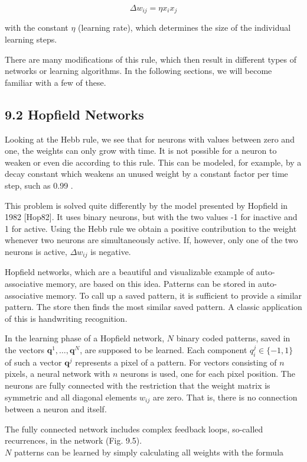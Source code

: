 \documentclass[10pt]{article}
\begin{document}
$$
\Delta w_{i j}=\eta x_{i} x_{j}
$$

with the constant $\eta$ (learning rate), which determines the size of the individual learning steps.

There are many modifications of this rule, which then result in different types of networks or learning algorithms. In the following sections, we will become familiar with a few of these.

\subsection*{9.2 Hopfield Networks}
Looking at the Hebb rule, we see that for neurons with values between zero and one, the weights can only grow with time. It is not possible for a neuron to weaken or even die according to this rule. This can be modeled, for example, by a decay constant which weakens an unused weight by a constant factor per time step, such as 0.99 .

This problem is solved quite differently by the model presented by Hopfield in 1982 [Hop82]. It uses binary neurons, but with the two values -1 for inactive and 1 for active. Using the Hebb rule we obtain a positive contribution to the weight whenever two neurons are simultaneously active. If, however, only one of the two neurons is active, $\Delta w_{i j}$ is negative.

Hopfield networks, which are a beautiful and visualizable example of auto-associative memory, are based on this idea. Patterns can be stored in auto-associative memory. To call up a saved pattern, it is sufficient to provide a similar pattern. The store then finds the most similar saved pattern. A classic application of this is handwriting recognition.

In the learning phase of a Hopfield network, $N$ binary coded patterns, saved in the vectors $\boldsymbol{q}^{1}, \ldots, \boldsymbol{q}^{N}$, are supposed to be learned. Each component $q_{i}^{j} \in\{-1,1\}$ of such a vector $\boldsymbol{q}^{j}$ represents a pixel of a pattern. For vectors consisting of $n$ pixels, a neural network with $n$ neurons is used, one for each pixel position. The neurons are fully connected with the restriction that the weight matrix is symmetric and all diagonal elements $w_{i j}$ are zero. That is, there is no connection between a neuron and itself.

The fully connected network includes complex feedback loops, so-called recurrences, in the network (Fig. 9.5).\\
$N$ patterns can be learned by simply calculating all weights with the formula
\end{document}
